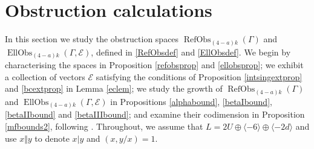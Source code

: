 \documentclass[12pt, a4paper]{article}
\newcommand{\la}{\langle}
\newcommand{\ra}{\rangle}
\newcommand{\ec}{\mathcal{E}}
\newcommand{\opn}{\operatorname}
\newcommand{\op}{\oplus}
\begin{document}
 \section{Obstruction calculations}\label{ObsSec}
In this section we study the obstruction spaces $\opn{RefObs}_{(4-a)k}(\Gamma)$ and $\opn{EllObs}_{(4-a)k}(\Gamma, \ec)$, defined in \eqref{RefObsdef} and \eqref{EllObsdef}.
We begin by characterising the spaces in Proposition \ref{refobsprop} and \ref{ellobsprop};
we exhibit a collection of vectors $\ec$ satisfying the conditions of Proposition \ref{intsingextprop} and \ref{bcextprop} in Lemma \ref{eclem}; 
we study the growth of $\opn{RefObs}_{(4-a)k}(\Gamma)$ and $\opn{EllObs}_{(4-a)k}(\Gamma, \ec)$ in Propositions \ref{alphabound}, \ref{betaIbound}, \ref{betaIIbound} and \ref{betaIIIbound}; and examine their codimension in Proposition \ref{mfbounds2}, following \cite{HMvol}. Throughout, we assume that $L=2U \op \la -6 \ra \op \la -2d \ra$ and use $x \Vert y$ to denote $x \vert y$ and $(x, y/x)=1$.
\end{document}
